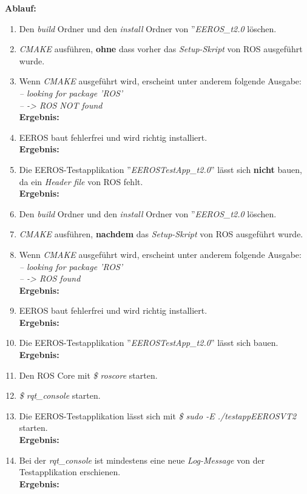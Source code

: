 \textbf{Ablauf: } 
\begin{enumerate}
\item Den \textit{build} Ordner und den \textit{install} Ordner von ''\textit{EEROS\_t2.0} löschen.
\item \textit{CMAKE} ausführen, \textbf{ohne} dass vorher das \textit{Setup-Skript} von ROS ausgeführt wurde.
\item Wenn \textit{CMAKE} ausgeführt wird, erscheint unter anderem folgende Ausgabe: \\
\textit{-- looking for package 'ROS' \\
-- -> ROS NOT found} \\
\textbf{Ergebnis:} \checkmark
\item EEROS baut fehlerfrei und wird richtig installiert. \\
\textbf{Ergebnis:} \checkmark
\item Die EEROS-Testapplikation ''\textit{EEROSTestApp\_t2.0}'' lässt sich \textbf{nicht} bauen, da ein \textit{Header file} von ROS fehlt. \\
\textbf{Ergebnis:} \checkmark
\item Den \textit{build} Ordner und den \textit{install} Ordner von ''\textit{EEROS\_t2.0} löschen.
\item \textit{CMAKE} ausführen, \textbf{nachdem} das \textit{Setup-Skript} von ROS ausgeführt wurde.
\item Wenn \textit{CMAKE} ausgeführt wird, erscheint unter anderem folgende Ausgabe: \\
\textit{-- looking for package 'ROS' \\
-- -> ROS found} \\
\textbf{Ergebnis:} \checkmark
\item EEROS baut fehlerfrei und wird richtig installiert. \\
\textbf{Ergebnis:} \checkmark
\item Die EEROS-Testapplikation ''\textit{EEROSTestApp\_t2.0}'' lässt sich bauen. \\
\textbf{Ergebnis:} \checkmark
\item Den ROS Core mit \textit{\$ roscore} starten.
\item \textit{\$ rqt\_console} starten.
\item Die EEROS-Testapplikation lässt sich mit \textit{\$ sudo -E ./testappEEROSVT2 } starten. \\
\textbf{Ergebnis:} \checkmark
\item Bei der \textit{rqt\_console} ist mindestens eine neue \textit{Log-Message} von der Testapplikation erschienen. \\
\textbf{Ergebnis:} \checkmark
\end{enumerate}



